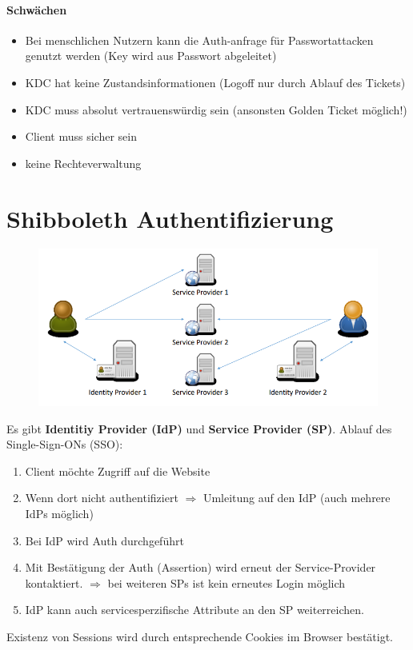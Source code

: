 \paragraph{Schwächen}
\begin{itemize}
	\item Bei menschlichen Nutzern kann die Auth-anfrage für Passwortattacken genutzt werden (Key wird aus Passwort abgeleitet)
	\item KDC hat keine Zustandsinformationen (Logoff nur durch Ablauf des Tickets)
	\item KDC muss absolut vertrauenswürdig sein (ansonsten Golden Ticket möglich!)
	\item Client muss sicher sein
	\item keine Rechteverwaltung
\end{itemize}

\section{Shibboleth Authentifizierung}
\begin{figure}[H]
	\begin{center}
		\includegraphics[scale=0.8]{Resources/ShibbolethAuth}
		\caption{}
		\label{fig:ShibbolethAuth}
	\end{center}
\end{figure}
Es gibt \textbf{Identitiy Provider (IdP)} und \textbf{Service Provider (SP)}.
Ablauf des Single-Sign-ONs (SSO):
\begin{enumerate}
	\item Client möchte Zugriff auf die Website
	\item Wenn dort nicht authentifiziert $\Rightarrow$ Umleitung auf den IdP (auch mehrere IdPs möglich)
	\item Bei IdP wird Auth durchgeführt
	\item Mit Bestätigung der Auth (Assertion) wird erneut der Service-Provider kontaktiert.
	$\Rightarrow$ bei weiteren SPs ist kein erneutes Login möglich
	\item IdP kann auch servicesperzifische Attribute an den SP weiterreichen.
\end{enumerate}
Existenz von Sessions wird durch entsprechende Cookies im Browser bestätigt.

